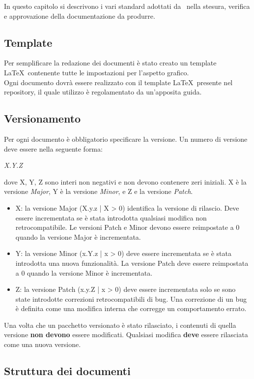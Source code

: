 In questo capitolo si descrivono i vari standard adottati da \GRUPPO\ nella stesura, verifica e approvazione della documentazione da produrre.
\subsection{Template}
Per semplificare la redazione dei documenti è stato creato un template \LaTeX\ contenente tutte le impostazioni per l'aspetto grafico. \\
Ogni documento dovrà essere realizzato con il template \LaTeX\ presente nel \gls{repository}, il quale utilizzo è regolamentato da un'apposita guida.
\subsection{Versionamento}
Per ogni documento è obbligatorio specificare la versione. Un numero di versione deve essere nella seguente forma:
\begin{center}
	\emph{X.Y.Z}
\end{center}
dove X, Y, Z sono interi non negativi e non devono contenere zeri iniziali. X è la versione \textit{Major}, Y è la versione \textit{Minor}, e Z e la versione \textit{Patch}.
\begin{itemize}
	\item X: la versione Major (X.y.z | X > 0) identifica la versione di rilascio. Deve essere incrementata se è stata introdotta qualsiasi modifica non retrocompatibile. Le versioni Patch e Minor devono essere reimpostate a 0 quando la versione Major è incrementata. 
	\item Y: la versione Minor (x.Y.z | x > 0) deve essere incrementata se è stata introdotta una nuova funzionalità. La versione Patch deve essere reimpostata a 0 quando la versione Minor è incrementata.
	\item Z: la versione Patch (x.y.Z | x > 0) deve essere incrementata solo se sono state introdotte correzioni retrocompatibili di bug. Una correzione di un bug è definita come una modifica interna che corregge un comportamento errato.
\end{itemize}
Una volta che un pacchetto versionato è stato rilasciato, i contenuti di quella versione \textbf{non devono} essere modificati. Qualsiasi modifica \textbf{deve} essere rilasciata come una nuova versione.

\subsection{Struttura dei documenti}
